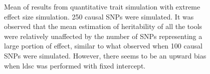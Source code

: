 \begin{figure}
{				
				\label{fig:ldscInQtEx250cMean}
			}
			\caption[Quantitative Trait with Extreme Effect Size Simulation Result(250 causal SNPs, Mean)]
			{Mean of results from quantitative trait simulation with extreme effect size simulation.
				250 causal \glspl{SNP} were simulated.
				It was observed that the mean estimation of heritability of all the tools were relatively unaffected by the number of \glspl{SNP} representing a large portion of effect, similar to what observed when 100 causal \glspl{SNP} were simulated.
				However, there seems to be an upward bias when \gls{ldsc} was performed with fixed intercept.
			} 
			\label{fig:QtEx250cMean}
		\end{figure}
		
